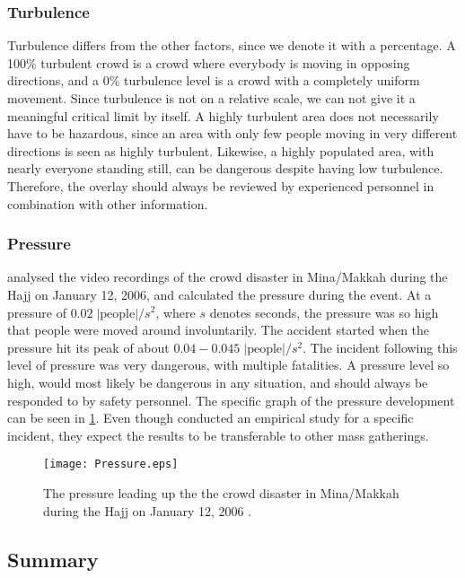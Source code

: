 \subsubsection{Turbulence}
Turbulence differs from the other factors, since we denote it with a percentage. A 100\% turbulent crowd is a crowd where everybody is moving in opposing directions, and a 0\% turbulence level is a crowd with a completely uniform movement. Since turbulence is not on a relative scale, we can not give it a meaningful critical limit by itself. A highly turbulent area does not necessarily have to be hazardous, since an area with only few people moving in very different directions is seen as highly turbulent. Likewise, a highly populated area, with nearly everyone standing still, can be dangerous despite having low turbulence. Therefore, the overlay should always be reviewed by experienced personnel in combination with other information. 

\subsubsection{Pressure}
\citet{empircalstudy} analysed the video recordings of the crowd disaster in Mina/Makkah during the Hajj on January 12, 2006, and calculated the pressure during the event. At a pressure of $0.02\; |\text{people}| / s^2$, where $s$ denotes seconds, the pressure was so high that people were moved around involuntarily. The accident started when the pressure hit its peak of about $0.04-0.045\; |\text{people}| / s^2$. The incident following this level of pressure was very dangerous, with multiple fatalities. A pressure level so high, would most likely be dangerous in any situation, and should always be responded to by safety personnel. The specific graph of the pressure development can be seen in \cref{mekkahCrowdDistaster206}. Even though \citeauthor{empircalstudy} conducted an empirical study for a specific incident, they expect the results to be transferable to other mass gatherings.

\begin{figure}[htbp]
    \centering
    \texttt{[image: Pressure.eps]}
    \caption[The pressure leading up the the crowd disaster in Mina/Makkah]{The pressure leading up the the crowd disaster in Mina/Makkah during the Hajj on January 12, 2006 \cite{empircalstudy}.}
    \label{mekkahCrowdDistaster206}
\end{figure}

\subsection{Summary}\label{sec:crowd_conditions_summary}

